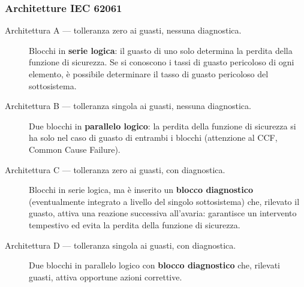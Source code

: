 \subsubsection{Architetture IEC 62061}
\begin{description}
    \item[Architettura A — tolleranza zero ai guasti, nessuna diagnostica.] Blocchi in \textbf{serie logica}: il guasto di uno solo determina la perdita della funzione di sicurezza. Se si conoscono i tassi di guasto pericoloso di ogni elemento, è possibile determinare il tasso di guasto pericoloso del sottosistema.
    \item[Architettura B — tolleranza singola ai guasti, nessuna diagnostica.] Due blocchi in \textbf{parallelo logico}: la perdita della funzione di sicurezza si ha solo nel caso di guasto di entrambi i blocchi (attenzione al CCF, Common Cause Failure).
    \item[Architettura C — tolleranza zero ai guasti, con diagnostica.] Blocchi in serie logica, ma è inserito un \textbf{blocco diagnostico} (eventualmente integrato a livello del singolo sottosistema) che, rilevato il guasto, attiva una reazione successiva all'avaria: garantisce un intervento tempestivo ed evita la perdita della funzione di sicurezza.
    \item[Architettura D — tolleranza singola ai guasti, con diagnostica.] Due blocchi in parallelo logico con \textbf{blocco diagnostico} che, rilevati guasti, attiva opportune azioni correttive.
\end{description}

